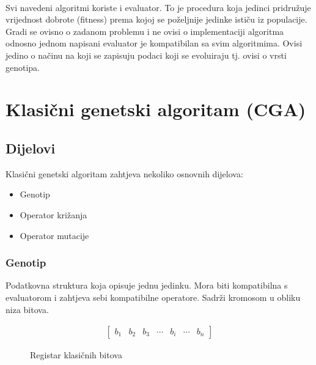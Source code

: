 \documentclass[times, utf8, zavrsni, numeric]{fer}
\begin{document}
\paragraph{}
Svi navedeni algoritmi koriste i evaluator.
To je procedura koja jedinci pridružuje vrijednost dobrote (fitness) prema kojoj se poželjnije jedinke ističu iz populacije. Gradi se ovisno o zadanom problemu i ne ovisi o implementaciji algoritma odnosno jednom napisani evaluator je kompatibilan sa svim algoritmima. Ovisi jedino o načinu na koji se zapisuju podaci koji se evoluiraju tj. ovisi o vrsti genotipa.

\section{Klasični genetski algoritam (CGA)}
\subsection{Dijelovi}
Klasični genetski algoritam zahtjeva nekoliko osnovnih dijelova:
\begin{itemize}
\item Genotip 
\item Operator križanja 
\item Operator mutacije
\end{itemize}

\subsubsection{Genotip}
Podatkovna struktura koja opisuje jednu jedinku. Mora biti kompatibilna s evaluatorom i zahtjeva sebi kompatibilne operatore. Sadrži kromosom u obliku niza bitova.
\begin{figure}[htb]
\centering
\begin{align*}
\begin{bmatrix}
b_1 & b_2 & b_3 & \cdots & b_i & \cdots & b_n
\end{bmatrix}
\end{align*}
\caption{Registar klasičnih bitova}
\end{figure}
\end{document}
